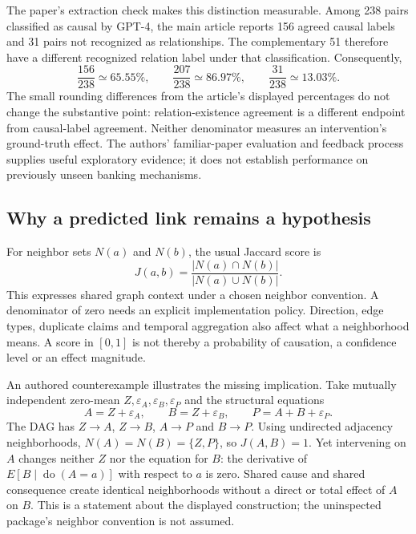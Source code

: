 The paper's extraction check makes this distinction measurable. Among 238 pairs classified as causal by GPT-4, the main article reports 156 agreed causal labels and 31 pairs not recognized as relationships. The complementary 51 therefore have a different recognized relation label under that classification. Consequently,
\begin{equation}
 \frac{156}{238}\simeq 65.55\%,\qquad
 \frac{207}{238}\simeq 86.97\%,\qquad
 \frac{31}{238}\simeq 13.03\%.
 \label{exec20:hypothesis-denominators}
\end{equation}
The small rounding differences from the article's displayed percentages do not change the substantive point: relation-existence agreement is a different endpoint from causal-label agreement. Neither denominator measures an intervention's ground-truth effect. The authors' familiar-paper evaluation and feedback process supplies useful exploratory evidence; it does not establish performance on previously unseen banking mechanisms.~\citep{exec20_hypothesis_generation,exec20_hypothesis_reference}

\subsection{Why a predicted link remains a hypothesis}
\label{exec20:hypothesis-graph}
For neighbor sets $N(a)$ and $N(b)$, the usual Jaccard score is
\begin{equation}
 J(a,b)=\frac{|N(a)\cap N(b)|}{|N(a)\cup N(b)|}.
 \label{exec20:hypothesis-jaccard}
\end{equation}
This expresses shared graph context under a chosen neighbor convention. A denominator of zero needs an explicit implementation policy. Direction, edge types, duplicate claims and temporal aggregation also affect what a neighborhood means. A score in $[0,1]$ is not thereby a probability of causation, a confidence level or an effect magnitude.

An authored counterexample illustrates the missing implication. Take mutually independent zero-mean $Z,\varepsilon_A,\varepsilon_B,\varepsilon_P$ and the structural equations
\begin{equation}
 A=Z+\varepsilon_A,\qquad B=Z+\varepsilon_B,
 \qquad P=A+B+\varepsilon_P.
 \label{exec20:hypothesis-world}
\end{equation}
The DAG has $Z\to A$, $Z\to B$, $A\to P$ and $B\to P$. Using undirected adjacency neighborhoods, $N(A)=N(B)=\{Z,P\}$, so $J(A,B)=1$. Yet intervening on $A$ changes neither $Z$ nor the equation for $B$: the derivative of $E[B\mid\operatorname{do}(A=a)]$ with respect to $a$ is zero. Shared cause and shared consequence create identical neighborhoods without a direct or total effect of $A$ on $B$. This is a statement about the displayed construction; the uninspected package's neighbor convention is not assumed.~\citep{exec20_hypothesis_reference}

